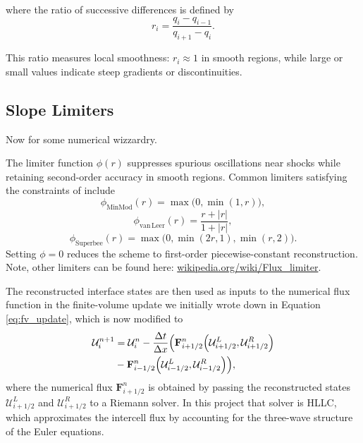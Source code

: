 \documentclass[12pt]{article}
\begin{document}
where the ratio of successive differences is defined by
\begin{equation}
    r_i = \frac{q_i - q_{i-1}}{q_{i+1} - q_i}.
\end{equation}

This ratio measures local smoothness: $r_i \approx 1$ in smooth regions, while large or small values indicate steep gradients or discontinuities.

\subsection{Slope Limiters}

Now for some numerical wizzardry. 

The limiter function $\phi(r)$ suppresses spurious oscillations near shocks while retaining second-order accuracy in smooth regions. Common limiters satisfying the constraints of \cite{1984SJNA...21..995S} include
\begin{equation}
    \phi_{\mathrm{MinMod}}(r) = \max\!\bigl(0,\min(1,r)\bigr), 
\end{equation}
\begin{equation}
    \phi_{\mathrm{van\,Leer}}(r) = \frac{r + |r|}{1 + |r|},
\end{equation}
\begin{equation}
    \phi_{\mathrm{Superbee}}(r) = \max\!\bigl(0,\min(2r,1),\min(r,2)\bigr).
\end{equation}
Setting $\phi = 0$ reduces the scheme to first-order piecewise-constant reconstruction. Note, other limiters can be found here: \url{wikipedia.org/wiki/Flux_limiter}.

The reconstructed interface states are then used as inputs to the numerical flux function in the finite-volume update we initially wrote down in Equation \ref{eq:fv_update}, which is now modified to
\begin{equation}
\begin{split}
    \mathcal{U}_i^{n+1} &= \mathcal{U}_i^{n}
    - \frac{\Delta t}{\Delta x}
    \Bigl(
        \mathbf{F}^{n}_{i+1/2}\!\left(\mathcal{U}^{L}_{i+1/2}, \mathcal{U}^{R}_{i+1/2}\right)\\
        &-
        \mathbf{F}^{n}_{i-1/2}\!\left(\mathcal{U}^{L}_{i-1/2}, \mathcal{U}^{R}_{i-1/2}\right)
    \Bigr),
\end{split}
\end{equation}
where the numerical flux $\mathbf{F}_{i+1/2}^n$ is obtained by passing the reconstructed states $\mathcal{U}^L_{i+1/2}$ and $\mathcal{U}^R_{i+1/2}$ to a Riemann solver. In this project that solver is HLLC, which approximates the intercell flux by accounting for the three-wave structure of the Euler equations.
\end{document}
